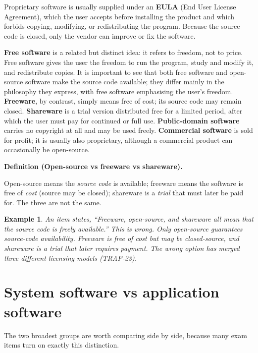 \documentclass[11pt]{article}
\newtheorem{example}{Example}[section]
\newenvironment{definitionbox}[1]{%
  \par\noindent\textbf{Definition (#1).}\ \itshape
}{\par\vspace{0.3em}}
\begin{document}
Proprietary software is usually supplied under an \textbf{EULA} (End User
License Agreement), which the user accepts before installing the product and
which forbids copying, modifying, or redistributing the program. Because the
source code is closed, only the vendor can improve or fix the software.

\textbf{Free software} is a related but distinct idea: it refers to freedom,
not to price. Free software gives the user the freedom to run the program,
study and modify it, and redistribute copies. It is important to see that both
free software and open-source software make the source code available; they
differ mainly in the philosophy they express, with free software emphasising
the user's freedom. \textbf{Freeware}, by contrast,
simply means free of cost; its source code may remain closed.
\textbf{Shareware} is a trial version distributed free for a limited period,
after which the user must pay for continued or full use. \textbf{Public-domain
software} carries no copyright at all and may be used freely.
\textbf{Commercial software} is sold for profit; it is usually also
proprietary, although a commercial product can occasionally be open-source.

\begin{definitionbox}{Open-source vs freeware vs shareware}
Open-source means the \emph{source code} is available; freeware means the
software is free of \emph{cost} (source may be closed); shareware is a
\emph{trial} that must later be paid for. The three are not the same.
\end{definitionbox}

\begin{example}
An item states, ``Freeware, open-source, and shareware all mean that the
source code is freely available.'' This is wrong. Only open-source guarantees
source-code availability. Freeware is free of cost but may be closed-source,
and shareware is a trial that later requires payment. The wrong option has
merged three different licensing models (TRAP-23).
\end{example}

\section{System software vs application software}
The two broadest groups are worth comparing side by side, because many exam
items turn on exactly this distinction.
\end{document}

